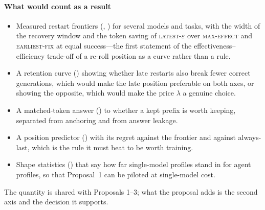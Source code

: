 \paragraph{What would count as a result}
\begin{itemize}[leftmargin=1.1em]
\item Measured restart frontiers (, ) for several models and tasks, with the width of the recovery window and the token saving of \textsc{latest-}$\varepsilon$ over \textsc{max-effect} and \textsc{earliest-fix} at equal success---the first statement of the effectiveness--efficiency trade-off of a re-roll position as a curve rather than a rule.
\item A retention curve () showing whether late restarts also break fewer correct generations, which would make the late position preferable on both axes, or showing the opposite, which would make the price $\lambda$ a genuine choice.
\item A matched-token answer () to whether a kept prefix is worth keeping, separated from anchoring and from answer leakage.
\item A position predictor () with its regret against the frontier and against always-last, which is the rule it must beat to be worth training.
\item Shape statistics () that say how far single-model profiles stand in for agent profiles, so that Proposal~1 can be piloted at single-model cost.
\end{itemize}
The quantity is shared with Proposals 1--3; what the proposal adds is the second axis and the decision it supports.
